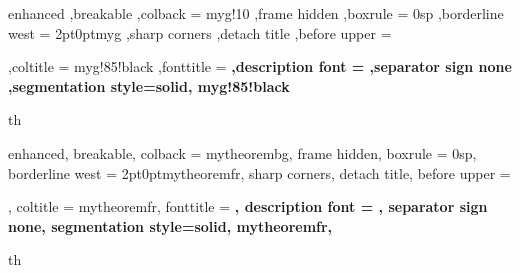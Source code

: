 
\setlength{\parindent}{0pt}


{%
	enhanced
	,breakable
	,colback = myg!10
	,frame hidden
	,boxrule = 0sp
	,borderline west = {2pt}{0pt}{myg}
	,sharp corners
	,detach title
	,before upper = \tcbtitle\par\smallskip
	,coltitle = myg!85!black
	,fonttitle = \bfseries\sffamily
	,description font = \mdseries
	,separator sign none
	,segmentation style={solid, myg!85!black}
}
{th}






{%
	enhanced,
	breakable,
	colback = mytheorembg,
	frame hidden,
	boxrule = 0sp,
	borderline west = {2pt}{0pt}{mytheoremfr},
	sharp corners,
	detach title,
	before upper = \tcbtitle\par\smallskip,
	coltitle = mytheoremfr,
	fonttitle = \bfseries\sffamily,
	description font = \mdseries,
	separator sign none,
	segmentation style={solid, mytheoremfr},
}
{th}



